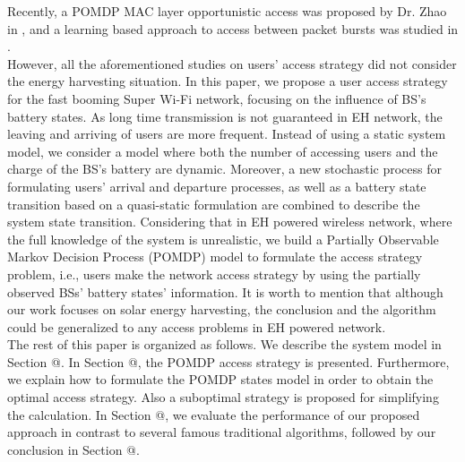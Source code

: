 \documentclass[journal,12pt,draftclsnofoot,onecolumn]{IEEEtran}
\makeatletter
\newcommand{\Rmnum}[1]{\expandafter\@slowromancap\romannumeral #1@}
\makeatother
\begin{document}
Recently, a POMDP MAC layer opportunistic access was proposed by Dr. Zhao in \cite{zhao1}, and
a learning based approach to access between packet bursts was studied in \cite{kae1}.
\\
\indent However, all the aforementioned studies on users' access strategy did not consider the energy harvesting situation.
In this paper, we propose a user access strategy for the fast booming Super Wi-Fi network, focusing on the influence of BS's battery states.
As long time transmission is not guaranteed in EH network,
the leaving and arriving of users are more frequent.
Instead of using a static system model,
we consider a model where both the number of accessing users and the charge of the BS's battery are dynamic.
Moreover, a new stochastic process for formulating users' arrival and departure processes, as well as a battery state transition based on a quasi-static formulation
are combined to describe the system state transition.
Considering that in EH powered wireless network, where the full knowledge of the system is unrealistic,
we build a Partially Observable Markov Decision Process (POMDP) model to formulate the access strategy problem, i.e., users make the network access strategy by using the partially observed BSs' battery states' information.
It is worth to mention that although our work focuses on solar energy harvesting,
the conclusion and the algorithm could be generalized to any access problems in EH powered network.
\\
\indent The rest of this paper is organized as follows.
We describe the system model in Section \Rmnum{2}.
In Section \Rmnum{3}, the POMDP access strategy is presented.
Furthermore, we explain how to formulate the POMDP states model in order to obtain the optimal access strategy.
Also a suboptimal strategy is proposed for simplifying the calculation.
In Section \Rmnum{4}, we evaluate the performance of our proposed approach in contrast to several famous traditional algorithms, followed by our conclusion in Section \Rmnum{5}.
\end{document}
